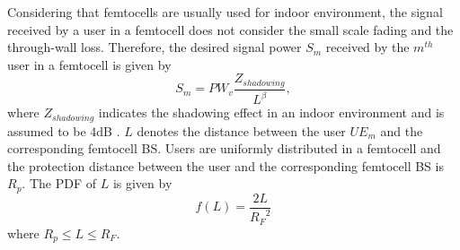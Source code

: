 \documentclass[10pt,final,journal,letterpaper,twoside,twocolumn]{IEEEtran}
\begin{document}
Considering that femtocells are usually used for indoor environment, the signal received by a user in a femtocell does not consider the small
scale fading and the through-wall loss. Therefore, the desired signal power ${S_m}$
received by the ${m^{th}}$ user in a femtocell is given by
\begin{equation}
  {S_m} = P{W_v}\frac{{{Z_{shadowing}}}}{{{L^\beta }}},
  \label{eq31}
  \tag{24}
\end{equation}
where ${Z_{shadowing}}$ indicates the shadowing effect in an indoor
environment and is assumed to be 4dB \cite{femtoforum}. $L$ denotes the distance between
the user $U{E_m}$ and the corresponding femtocell BS. Users are uniformly distributed in a
femtocell and the protection distance between the user and the corresponding femtocell BS
is ${R_p}$. The PDF of $L$ is given by
\begin{equation}
f\left( L \right) = \frac{{2L}}{{{R_F}^2}}
\label{eq32}
\tag{25}
\end{equation}
where ${R_p} \le L \le {R_F}$.
\end{document}
